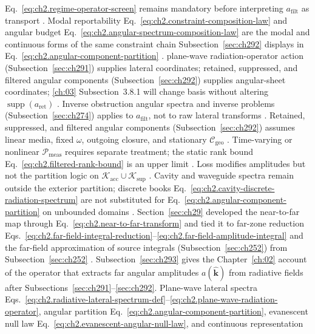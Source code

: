 Eq.~\eqref{eq:ch2.regime-operator-screen} remains mandatory before interpreting
\(a_{\mathrm{filt}}\) as transport \cite{harrington2001}. Modal reportability Eq.~\eqref{eq:ch2.constraint-composition-law} and angular budget
Eq.~\eqref{eq:ch2.angular-spectrum-composition-law} are the modal and continuous forms of the
same constraint chain Subsection~\ref{sec:ch292} displays in
Eq.~\eqref{eq:ch2.angular-component-partition} \cite{stratton1941}. plane-wave radiation-operator action (Subsection~\ref{sec:ch291}) supplies lateral coordinates; retained, suppressed, and filtered angular components (Subsection~\ref{sec:ch292}) supplies angular-sheet coordinates; \ref{ch:03}
Subsection~3.8.1 will change basis without altering
\(\operatorname{supp}(a_{\mathrm{ret}})\) \cite{stratton1941}. Inverse obstruction
angular spectra and inverse problems (Subsection~\ref{sec:ch274}) applies to
\(a_{\mathrm{filt}}\), not to raw lateral transforms \cite{harrington2001}. Retained, suppressed, and filtered angular components (Subsection~\ref{sec:ch292}) assumes linear media, fixed \(\omega\), outgoing
closure, and stationary \(\mathcal{C}_{\mathrm{geo}}\) \cite{stratton1941}. Time-varying
or nonlinear \(\mathcal{P}_{\mathrm{meas}}\) requires separate treatment; the static rank bound
Eq.~\eqref{eq:ch2.filtered-rank-bound} is an upper limit \cite{stratton1941}. Loss modifies
amplitudes but not the partition logic on \(\mathcal{K}_{\mathrm{acc}}\cup\mathcal{K}_{\mathrm{sup}}\)
\cite{stratton1941}. Cavity and waveguide spectra remain outside the exterior partition; discrete
books Eq.~\eqref{eq:ch2.cavity-discrete-radiation-spectrum} are not substituted for
Eq.~\eqref{eq:ch2.angular-component-partition} on unbounded domains \cite{jackson1999}.
\label{sec:ch293}
Section~\ref{sec:ch29} developed the near-to-far map through
Eq.~\eqref{eq:ch2.near-to-far-transform} and tied it to far-zone reduction
Eqs.~\eqref{eq:ch2.far-field-integral-reduction}--\eqref{eq:ch2.far-field-amplitude-integral}
and the far-field approximation of source integrals (Subsection~\ref{sec:ch252}) from Subsection~\ref{sec:ch252} \cite{stratton1941}. Subsection~\ref{sec:ch293} gives the
Chapter~\ref{ch:02} account of the operator that extracts far angular amplitudes
\(a(\widehat{\mathbf{k}})\) from radiative fields after
Subsections~\ref{sec:ch291}--\ref{sec:ch292}. Plane-wave lateral spectra
Eqs.~\eqref{eq:ch2.radiative-lateral-spectrum-def}--\eqref{eq:ch2.plane-wave-radiation-operator},
angular partition Eq.~\eqref{eq:ch2.angular-component-partition}, evanescent null law
Eq.~\eqref{eq:ch2.evanescent-angular-null-law}, and continuous representation
